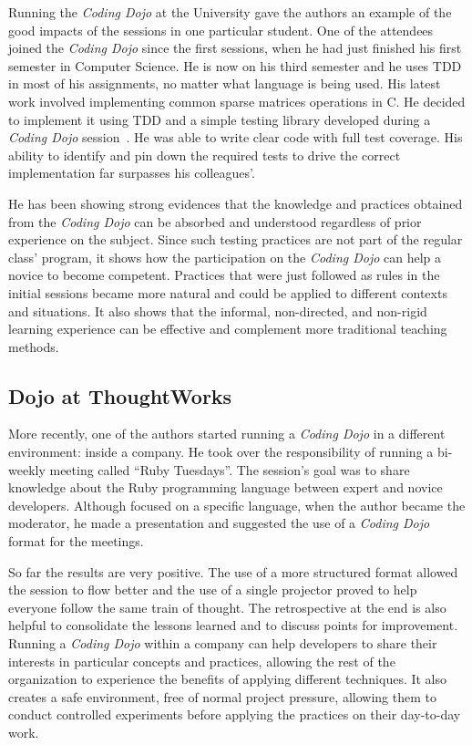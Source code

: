 Running the \emph{Coding Dojo} at the University gave the authors an example of
the good impacts of the sessions in one particular student. One of the attendees joined the
\emph{Coding Dojo} since the first sessions, when he had just finished his first semester in
Computer Science. He is now on his third semester and he uses TDD in most of his assignments,
no matter what language is being used. His latest
work involved implementing common sparse matrices operations in C. He decided to
implement it using TDD and a simple testing library developed during a \emph{Coding Dojo}
session~\cite{Dojo31}. He was able to write clear code with full test coverage. His ability to
identify and pin down the required tests to drive the correct implementation far surpasses his
colleagues'.

He has been showing strong evidences that the knowledge and practices obtained from the
\emph{Coding Dojo} can be absorbed and understood regardless of prior experience on the
subject. Since such testing practices are not part of the regular class' program, it shows
how the participation on the \emph{Coding Dojo} can help a novice to become competent. Practices
that were just followed as rules in the initial sessions became more natural and could be applied
to different contexts and situations. It also shows that the informal, non-directed, and non-rigid
learning experience can be effective and complement more traditional teaching methods.

\subsection{Dojo at ThoughtWorks}

More recently, one of the authors started running a
\emph{Coding Dojo} in a different environment: inside a company. He
took over the responsibility of running a bi-weekly meeting called
``Ruby Tuesdays''. The session's goal was to share knowledge about the
Ruby programming language between expert and novice
developers. Although focused on a specific language,
when the author became the moderator, he made a presentation and
suggested the use of a \emph{Coding Dojo} format for the meetings.

So far the results are very positive. The use of a more structured format allowed the session to
flow better and the use of a single projector proved to help everyone follow the same train of
thought. The retrospective at the end is also helpful to consolidate the lessons learned and to
discuss points for improvement. Running a \emph{Coding Dojo} within
a company can help developers to share their interests in particular concepts and practices, allowing
the rest of the organization to experience the benefits of applying different techniques. It also
creates a safe environment, free of normal project pressure, allowing them to conduct controlled
experiments before applying the practices on their day-to-day work.